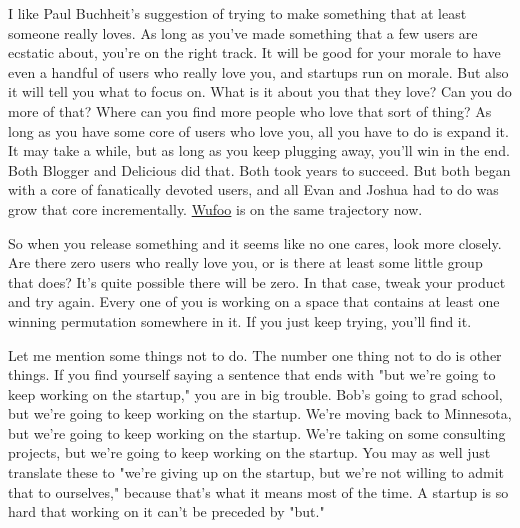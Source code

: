 I like Paul Buchheit's
                    suggestion of trying to make something that at least someone
                    really loves. As long as you've made something that a few
                    users are ecstatic about, you're on the right track. It will
                    be good for your morale to have even a handful of users who
                    really love you, and startups run on morale. But also it
                    will tell you what to focus on. What is it about you that
                    they love? Can you do more of that? Where can you find more
                    people who love that sort of thing? As long as you have some
                    core of users who love you, all you have to do is expand it.
                    It may take a while, but as long as you keep plugging away,
                    you'll win in the end. Both Blogger and Delicious did that.
                    Both took years to succeed. But both began with a core of
                    fanatically devoted users, and all Evan and Joshua had to do
                    was grow that core incrementally.
                    \href{http://wufoo.com}{Wufoo} is on the same
                    trajectory now.

So when you release something and
                    it seems like no one cares, look more closely. Are there
                    zero users who really love you, or is there at least some
                    little group that does? It's quite possible there will be
                    zero. In that case, tweak your product and try again. Every
                    one of you is working on a space that contains at least one
                    winning permutation somewhere in it. If you just keep
                    trying, you'll find it.

Let me mention some
                    things not to do. The number one thing not to do is other
                    things. If you find yourself saying a sentence that ends
                    with "but we're going to keep working on the startup," you
                    are in big trouble. Bob's going to grad school, but we're
                    going to keep working on the startup. We're moving back to
                    Minnesota, but we're going to keep working on the startup.
                    We're taking on some consulting projects, but we're going to
                    keep working on the startup. You may as well just translate
                    these to "we're giving up on the startup, but we're not
                    willing to admit that to ourselves," because that's what it
                    means most of the time. A startup is so hard that working on
                    it can't be preceded by "but."

